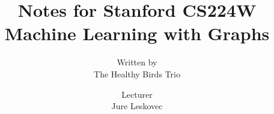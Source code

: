 \documentclass[12pt]{article}
\begin{document}

\title{
Notes for Stanford CS224W \\
\textbf{Machine Learning with Graphs}
}

\author{
  Written by\\
  The Healthy Birds Trio
  \and
  Lecturer\\
  Jure Leskovec
}

\maketitle

\setcounter{tocdepth}{2}
\tableofcontents

\newpage

\setcounter{section}{-1}










\end{document}
